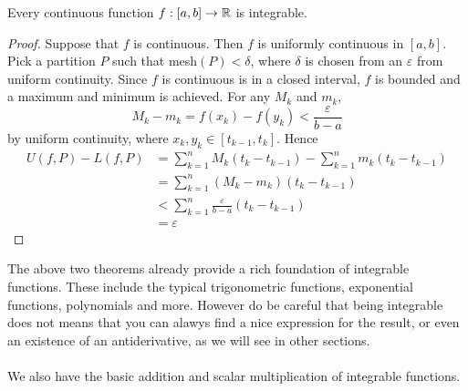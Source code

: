 \documentclass[a4paper]{article}
\begin{document}
\begin{thm}{}{} Every continuous function $f:[a,b]\to\mathbb{R}$ is integrable. \tcbline
\begin{proof} Suppose that $f$ is continuous. Then $f$ is uniformly continuous in $[a,b]$. Pick a partition $P$ such that mesh$(P)<\delta$, where $\delta$ is chosen from an $\varepsilon$ from uniform continuity. Since $f$ is continuous is in a closed interval, $f$ is bounded and a maximum and minimum is achieved. For any $M_k$ and $m_k$, $$M_k-m_k=f(x_k)-f(y_k)<\frac{\varepsilon}{b-a}$$ by uniform continuity, where $x_k,y_k\in[t_{k-1},t_k]$. Hence 
\begin{align*}
U(f,P)-L(f,P)&=\sum_{k=1}^nM_k(t_k-t_{k-1})-\sum_{k=1}^nm_k(t_k-t_{k-1})\\
&=\sum_{k=1}^n(M_k-m_k)(t_k-t_{k-1})\\
&<\sum_{k=1}^n\frac{\varepsilon}{b-a}(t_k-t_{k-1})\\
&=\varepsilon
\end{align*}
\end{proof}
\end{thm}

The above two theorems already provide a rich foundation of integrable functions. These include the typical trigonometric functions, exponential functions, polynomials and more. However do be careful that being integrable does not means that you can alawys find a nice expression for the result, or even an existence of an antiderivative, as we will see in other sections. \\~\\
We also have the basic addition and scalar multiplication of integrable functions. 
\end{document}
